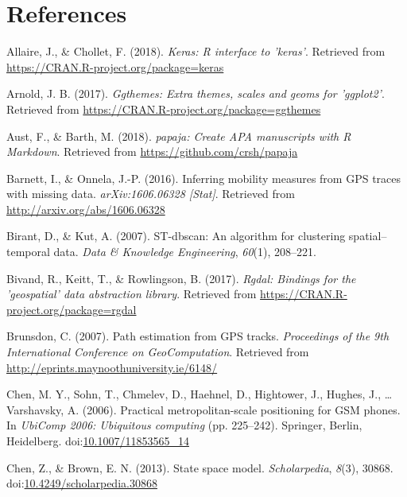 \documentclass[man]{apa6}
\theoremstyle{definition}
\theoremstyle{definition}
\theoremstyle{definition}
\theoremstyle{remark}
\begin{document}
\newpage

\section{References}\label{references}

\begingroup
\setlength{\parindent}{-0.5in} \setlength{\leftskip}{0.5in}

\hypertarget{refs}{}
\hypertarget{ref-R-keras}{}
Allaire, J., \& Chollet, F. (2018). \emph{Keras: R interface to
'keras'}. Retrieved from \url{https://CRAN.R-project.org/package=keras}

\hypertarget{ref-R-ggthemes}{}
Arnold, J. B. (2017). \emph{Ggthemes: Extra themes, scales and geoms for
'ggplot2'}. Retrieved from
\url{https://CRAN.R-project.org/package=ggthemes}

\hypertarget{ref-R-papaja}{}
Aust, F., \& Barth, M. (2018). \emph{papaja: Create APA manuscripts with
R Markdown}. Retrieved from \url{https://github.com/crsh/papaja}

\hypertarget{ref-barnett_inferring_2016}{}
Barnett, I., \& Onnela, J.-P. (2016). Inferring mobility measures from
GPS traces with missing data. \emph{arXiv:1606.06328 {[}Stat{]}}.
Retrieved from \url{http://arxiv.org/abs/1606.06328}

\hypertarget{ref-_st-dbscan:_2007}{}
Birant, D., \& Kut, A. (2007). ST-dbscan: An algorithm for clustering
spatial--temporal data. \emph{Data \& Knowledge Engineering},
\emph{60}(1), 208--221.

\hypertarget{ref-R-rgdal}{}
Bivand, R., Keitt, T., \& Rowlingson, B. (2017). \emph{Rgdal: Bindings
for the 'geospatial' data abstraction library}. Retrieved from
\url{https://CRAN.R-project.org/package=rgdal}

\hypertarget{ref-brunsdon_path_2007}{}
Brunsdon, C. (2007). Path estimation from GPS tracks. \emph{Proceedings
of the 9th International Conference on GeoComputation}. Retrieved from
\url{http://eprints.maynoothuniversity.ie/6148/}

\hypertarget{ref-chen_practical_2006}{}
Chen, M. Y., Sohn, T., Chmelev, D., Haehnel, D., Hightower, J., Hughes,
J., \ldots{} Varshavsky, A. (2006). Practical metropolitan-scale
positioning for GSM phones. In \emph{UbiComp 2006: Ubiquitous computing}
(pp. 225--242). Springer, Berlin, Heidelberg.
doi:\href{https://doi.org/10.1007/11853565_14}{10.1007/11853565\_14}

\hypertarget{ref-chen_state_2013}{}
Chen, Z., \& Brown, E. N. (2013). State space model.
\emph{Scholarpedia}, \emph{8}(3), 30868.
doi:\href{https://doi.org/10.4249/scholarpedia.30868}{10.4249/scholarpedia.30868}
\end{document}
